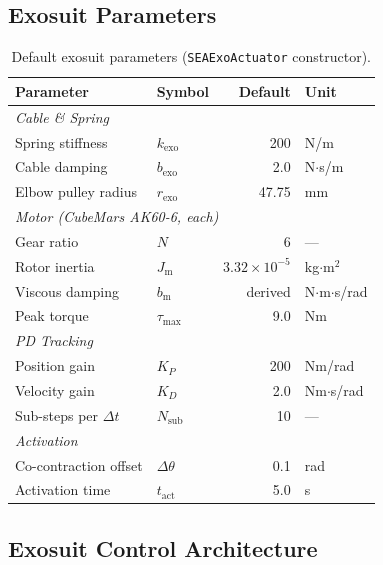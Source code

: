 \documentclass[11pt,a4paper]{article}
\newcommand{\Jm}{J_{\mathrm{m}}}
\newcommand{\bmotor}{b_{\mathrm{m}}}
\begin{document}
\subsection{Exosuit Parameters}

\begin{table}[H]
\centering
\caption{Default exosuit parameters (\texttt{SEAExoActuator} constructor).}
\begin{tabular}{llrl}
\toprule
\textbf{Parameter} & \textbf{Symbol} & \textbf{Default} & \textbf{Unit} \\
\midrule
\multicolumn{4}{l}{\textit{Cable \& Spring}} \\
Spring stiffness         & $k_{\mathrm{exo}}$         & 200       & N/m \\
Cable damping            & $b_{\mathrm{exo}}$         & 2.0       & N$\cdot$s/m \\
Elbow pulley radius      & $r_{\mathrm{exo}}$         & 47.75     & mm \\
\midrule
\multicolumn{4}{l}{\textit{Motor (CubeMars AK60-6, each)}} \\
Gear ratio               & $N$          & 6         & --- \\
Rotor inertia            & $\Jm$        & $3.32 \times 10^{-5}$  & kg$\cdot$m$^2$ \\
Viscous damping          & $\bmotor$    & derived   & N$\cdot$m$\cdot$s/rad \\
Peak torque              & $\tau_{\max}$& 9.0       & Nm \\
\midrule
\multicolumn{4}{l}{\textit{PD Tracking}} \\
Position gain            & $K_P$        & 200       & Nm/rad \\
Velocity gain            & $K_D$        & 2.0       & Nm$\cdot$s/rad \\
Sub-steps per $\Delta t$ & $N_{\mathrm{sub}}$ & 10 & --- \\
\midrule
\multicolumn{4}{l}{\textit{Activation}} \\
Co-contraction offset    & $\Delta\theta$ & 0.1    & rad \\
Activation time          & $t_{\mathrm{act}}$ & 5.0 & s \\
\bottomrule
\end{tabular}
\end{table}


\subsection{Exosuit Control Architecture}
\label{sec:exo_arch}
\end{document}
